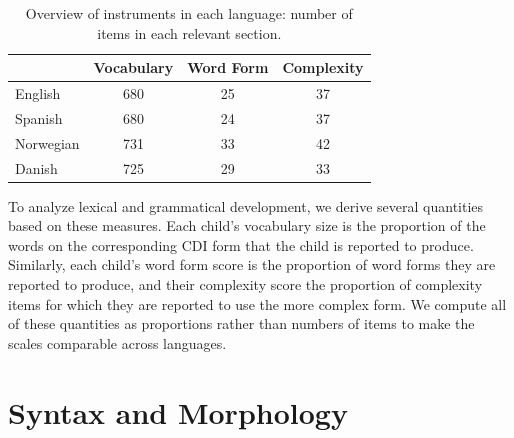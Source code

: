\documentclass[10pt,letterpaper]{article}
\begin{document}
\begin{table}[b]
\begin{center}
\begin{tabular}{| l | c | c | c |}
\hline
& Vocabulary & Word Form & Complexity\\ \hline
English & 680 & 25 & 37\\ \hline
Spanish & 680 & 24 & 37\\ \hline
Norwegian & 731 & 33 & 42\\ \hline
Danish & 725 & 29 & 33\\ \hline
\end{tabular}
\caption{\label{table:measures} Overview of instruments in each language: number of items in each relevant section.}
\end{center}
\end{table}

To analyze lexical and grammatical development, we derive several quantities based on these measures. Each child's vocabulary size is the proportion of the words on the corresponding CDI form that the child is reported to produce. Similarly, each child's word form score is the proportion of word forms they are reported to produce, and their complexity score the proportion of complexity items for which they are reported to use the more complex form. We compute all of these quantities as proportions rather than numbers of items to make the scales comparable across languages.

\section{Syntax and Morphology}
\end{document}
